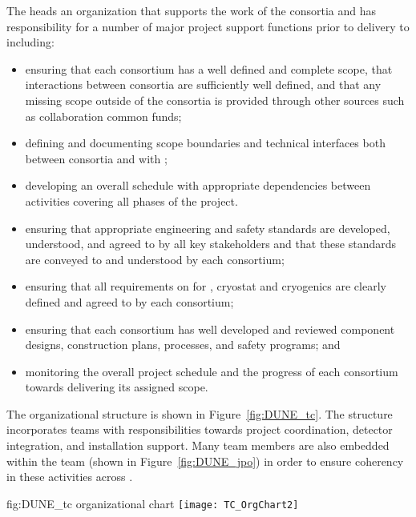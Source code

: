 The  heads an organization that supports the work of 
the consortia and has responsibility for a number of major project 
support functions prior to delivery to  including:
\begin{itemize}
\item ensuring that each consortium has a well defined and complete
  scope, that interactions between consortia are sufficiently 
  well defined, and that any missing scope outside of the 
  consortia is provided through other sources such as collaboration
  common funds;
\item defining and documenting scope boundaries and technical 
  interfaces both between consortia and with ;  
\item developing an overall schedule with appropriate dependencies
  between activities covering all phases of the project. 
\item ensuring that appropriate engineering and safety standards 
  are developed, understood, and agreed to by all key stakeholders 
  and that these standards are conveyed to and understood by each
  consortium;
\item ensuring that all  requirements on  
  for , cryostat and cryogenics are clearly defined and 
  agreed to by each consortium;
\item ensuring that each consortium has well developed and reviewed
  component designs, construction plans,  processes, and 
  safety programs; and
\item monitoring the overall project schedule and the progress of 
  each consortium towards delivering its assigned scope. 
\end{itemize}

The   organizational structure is shown 
in Figure~\ref{fig:DUNE_tc}.  The structure incorporates teams 
with responsibilities towards project coordination, detector 
integration, and installation support.  Many  team 
members are also embedded within the  team (shown 
in Figure~\ref{fig:DUNE_jpo}) in order to ensure coherency in 
these activities across .
\begin{dunefigure}{fig:DUNE_tc}
  {  organizational chart}
  \texttt{[image: TC\_OrgChart2]}
\end{dunefigure}
 
